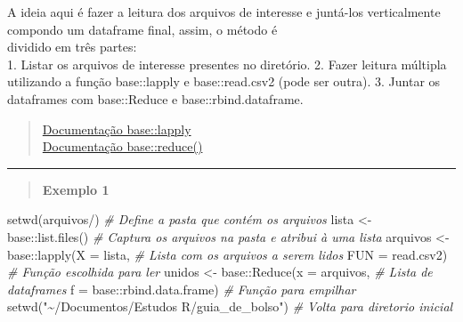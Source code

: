 \documentclass[
]{book}
\newenvironment{Shaded}{\begin{snugshade}}{\end{snugshade}}
\newcommand{\AttributeTok}[1]{\textcolor[rgb]{0.77,0.63,0.00}{#1}}
\newcommand{\CommentTok}[1]{\textcolor[rgb]{0.56,0.35,0.01}{\textit{#1}}}
\newcommand{\FunctionTok}[1]{\textcolor[rgb]{0.00,0.00,0.00}{#1}}
\newcommand{\NormalTok}[1]{#1}
\newcommand{\OtherTok}[1]{\textcolor[rgb]{0.56,0.35,0.01}{#1}}
\newcommand{\SpecialCharTok}[1]{\textcolor[rgb]{0.00,0.00,0.00}{#1}}
\newcommand{\StringTok}[1]{\textcolor[rgb]{0.31,0.60,0.02}{#1}}
\theoremstyle{definition}
\theoremstyle{definition}
\theoremstyle{definition}
\theoremstyle{definition}
\theoremstyle{remark}
\begin{document}
A ideia aqui é fazer a leitura dos arquivos de interesse e juntá-los verticalmente compondo um dataframe final, assim, o método é\\
dividido em três partes:\\
1. Listar os arquivos de interesse presentes no diretório.
2. Fazer leitura múltipla utilizando a função base::lapply e base::read.csv2 (pode ser outra).
3. Juntar os dataframes com base::Reduce e base::rbind.dataframe.

\begin{quote}
\href{https://www.rdocumentation.org/packages/base/versions/3.6.2/topics/lapply}{Documentação base::lapply}\\
\href{https://www.rdocumentation.org/packages/purrr/versions/0.2.5/topics/reduce}{Documentação base::reduce()}
\end{quote}

\begin{center}\rule{0.5\linewidth}{0.5pt}\end{center}

\begin{quote}
\textbf{Exemplo 1}
\end{quote}

\begin{Shaded}
\begin{Highlighting}[]
\FunctionTok{setwd}\NormalTok{(}\StringTok{\textquotesingle{}arquivos/\textquotesingle{}}\NormalTok{)              }\CommentTok{\# Define a pasta que contém os arquivos}
\NormalTok{lista }\OtherTok{\textless{}{-}}\NormalTok{ base}\SpecialCharTok{::}\FunctionTok{list.files}\NormalTok{()     }\CommentTok{\# Captura os arquivos na pasta e atribui à uma lista}
\NormalTok{arquivos }\OtherTok{\textless{}{-}}\NormalTok{ base}\SpecialCharTok{::}\FunctionTok{lapply}\NormalTok{(}\AttributeTok{X =}\NormalTok{ lista,   }\CommentTok{\# Lista com os arquivos a serem lidos}
                         \AttributeTok{FUN =}\NormalTok{ read.csv2)  }\CommentTok{\# Função escolhida para ler}
\NormalTok{unidos }\OtherTok{\textless{}{-}}\NormalTok{ base}\SpecialCharTok{::}\FunctionTok{Reduce}\NormalTok{(}\AttributeTok{x =}\NormalTok{ arquivos,       }\CommentTok{\# Lista de dataframes}
                       \AttributeTok{f =}\NormalTok{ base}\SpecialCharTok{::}\NormalTok{rbind.data.frame)  }\CommentTok{\# Função para empilhar}
\FunctionTok{setwd}\NormalTok{(}\StringTok{"\textasciitilde{}/Documentos/Estudos R/guia\_de\_bolso"}\NormalTok{) }\CommentTok{\# Volta para diretorio inicial}
\end{Highlighting}
\end{Shaded}
\end{document}
